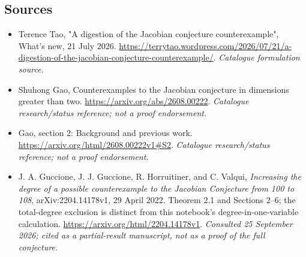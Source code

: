 \documentclass[11pt]{article}
\begin{document}
\subsection{Sources}
\begin{itemize}\raggedright
\item[\textnormal{[S1]}]\hypertarget{source:statement:1}{} Terence Tao, "A digestion of the Jacobian conjecture counterexample", What's new, 21 July 2026.
\url{https://terrytao.wordpress.com/2026/07/21/a-digestion-of-the-jacobian-conjecture-counterexample/}.
{\small\textit{Catalogue formulation source.}}
\item[\textnormal{[S2]}]\hypertarget{source:statement:2}{} Shuhong Gao, Counterexamples to the Jacobian conjecture in dimensions greater than two.
\url{https://arxiv.org/abs/2608.00222}.
{\small\textit{Catalogue research/status reference; not a proof endorsement.}}
\item[\textnormal{[S3]}]\hypertarget{source:statement:3}{} Gao, section 2: Background and previous work.
\url{https://arxiv.org/html/2608.00222v1#S2}.
{\small\textit{Catalogue research/status reference; not a proof endorsement.}}
\item[\textnormal{[E1]}]\hypertarget{extra:statement:1}{}
J. A. Guccione, J. J. Guccione, R. Horruitiner, and C. Valqui,
\emph{Increasing the degree of a possible counterexample to the Jacobian
Conjecture from 100 to 108}, arXiv:2204.14178v1, 29 April 2022.
Theorem 2.1 and Sections 2--6; the total-degree exclusion is distinct from
this notebook's degree-in-one-variable calculation.
\url{https://arxiv.org/html/2204.14178v1}.
{\small\textit{Consulted 25 September 2026; cited as a partial-result
manuscript, not as a proof of the full conjecture.}}
\end{itemize}
\end{document}
